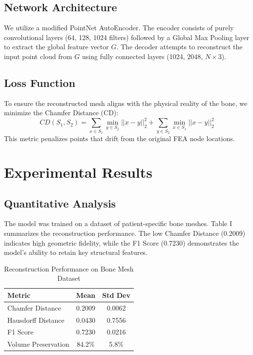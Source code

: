 \documentclass[conference]{IEEEtran}
\begin{document}
\subsection{Network Architecture}
We utilize a modified PointNet AutoEncoder. The encoder consists of purely convolutional layers (64, 128, 1024 filters) followed by a Global Max Pooling layer to extract the global feature vector $G$. The decoder attempts to reconstruct the input point cloud from $G$ using fully connected layers (1024, 2048, $N \times 3$).


\subsection{Loss Function}
To ensure the reconstructed mesh aligns with the physical reality of the bone, we minimize the Chamfer Distance (CD):
\begin{equation}
    CD(S_1, S_2) = \sum_{x \in S_1} \min_{y \in S_2} ||x-y||_2^2 + \sum_{y \in S_2} \min_{x \in S_1} ||x-y||_2^2
\end{equation}
This metric penalizes points that drift from the original FEA node locations.

\section{Experimental Results}

\subsection{Quantitative Analysis}
The model was trained on a dataset of patient-specific bone meshes. Table I summarizes the reconstruction performance. The low Chamfer Distance (0.2009) indicates high geometric fidelity, while the F1 Score (0.7230) demonstrates the model's ability to retain key structural features.

\begin{table}[htbp]
\caption{Reconstruction Performance on Bone Mesh Dataset}
\begin{center}
\begin{tabular}{lcc}
\toprule
\textbf{Metric} & \textbf{Mean} & \textbf{Std Dev} \\
\midrule
Chamfer Distance & 0.2009 & 0.0062 \\
Hausdorff Distance & 0.0430 & 0.7556 \\
F1 Score & 0.7230 & 0.0216 \\
Volume Preservation & 84.2\% & 5.8\% \\
\bottomrule
\end{tabular}
\label{tab1}
\end{center}
\end{table}
\end{document}
